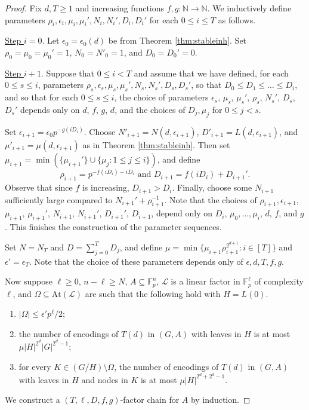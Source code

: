 \documentclass[12pt,oneside,british,a4wide]{amsart}
\numberwithin{equation}{section}
\theoremstyle{definition}
\def\F{\mathbb{F}}
\def\e{\epsilon}
\newcommand{\calL}{\mathcal{L}}
\newcommand{\At}{{\mathrm{At}}}
\begin{document}
\begin{proof}
Fix $d,T\geq 1$ and increasing functions $f,g:\mathbb{N}\rightarrow \mathbb{N}$.  We inductively define parameters $\rho_i,\e_i, \mu_i,\mu_i', N_i,N_i', D_i,D_i'$ for each $0\leq i\leq T$ as follows.

\underline{Step $i=0$}. Let $\e_0=\e_0(d)$ be from Theorem \ref{thm:stableinh}.  Set $\rho_0=\mu_0=\mu_0'=1$,  $N_0=N'_0=1$, and $D_0=D_0'=0$. 

\underline{Step $i+1$}.  Suppose that $0\leq i<T$ and assume that we have defined, for each $0\leq s\leq i$, parameters $\rho_s, \e_s, \mu_s,\mu_s',N_s,N_s',D_s,D_s'$, so that $D_0\leq D_1\leq \ldots \leq D_i$, and so that for each $0\leq s\leq i$, the choice of parameters $\e_s$, $\mu_s$, $\mu_s'$, $\rho_s$, $N_s'$, $D_s$, $D_s'$ depends only on $d$, $f$, $g$, $d$, and the choices of $D_j,\mu_j$ for $0\leq j<s$.

Set $\e_{i+1}=\e_0 p^{-g(iD_i)}$.  Choose $N'_{i+1}=N(d,\e_{i+1})$, $D'_{i+1}=L(d,\e_{i+1})$, and $\mu'_{i+1}=\mu(d,\e_{i+1})$ as in Theorem \ref{thm:stableinh}.  Then set $\mu_{i+1}=\min(\{\mu_{i+1}'\}\cup \{\mu_j: 1\leq j\leq i\})$, and define 
$$
\rho_{i+1}=p^{-f(iD_i)-iD_i}\text{ and }D_{i+1}=f(iD_i)+D_{i+1}'.
$$
Observe that since $f$ is increasing, $D_{i+1}>D_i$.  Finally, choose some $N_{i+1}$ sufficiently large compared to $N_{i+1}'+\rho_{i+1}^{-1}$.  Note that the choices of $\rho_{i+1},\e_{i+1}$, $\mu_{i+1}$, $\mu_{i+1}'$, $N_{i+1}$, $N_{i+1}'$, $D_{i+1}'$, $D_{i+1}$, depend only on $D_i$, $\mu_0,\ldots,\mu_i$,  $d$, $f$, and $g$.   This finishes the construction of the parameter sequences. 

Set $N=N_T$ and $D=\sum_{j=0}^TD_j$, and define $\mu=\min\{\mu_{i+1}\rho_{i+1}^{2^{d+1}}: i\in [T]\}$ and $\e'=\e_T$.    Note that the choice of these parameters depends only of $\e,d,T,f,g$.

Now suppose $\ell\geq 0$, $n-\ell\geq N$, $A\subseteq \F_p^n$, $\calL$ is a linear factor in $\F_p^{\ell}$ of complexity $\ell$, and $\Omega\subseteq \At(\calL)$ are such that the following hold with $H=L(0)$. 
\begin{enumerate}[label=\normalfont(\roman*)]
\item $|\Omega|\leq \e' p^{\ell}/2$;
\item the number of encodings of $T(d)$ in $(G,A)$ with leaves in $H$ is at most $\mu |H|^{2^d}|G|^{2^d-1}$;
\item for every $K\in (G/H)\setminus \Omega$, the number of encodings of $T(d)$ in $(G,A)$ with leaves in $H$ and nodes in $K$ is at most $\mu |H|^{2^d+2^d-1}$.  
\end{enumerate}
We construct a  $( T, \ell, D, f, g)$-factor chain for $A$ by induction. 


\end{proof}
\end{document}
